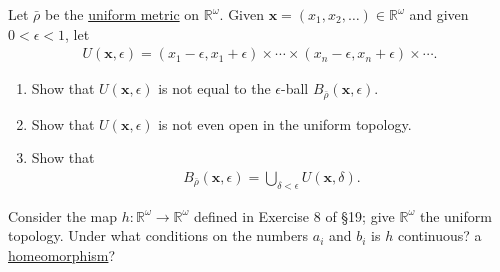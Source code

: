   \begin{exercise}[Munkres 20.6]
    Let $\bar{\rho}$ be the \hyperref[def:uniform-metric]{uniform metric} on $\mathbb{R}^\omega$. Given $\mathbf{x} = (x_1, x_2, \ldots) \in \mathbb{R}^\omega$ and given $0 < \epsilon < 1$, let
    \begin{align*}
      U(\mathbf{x}, \epsilon) = (x_1 - \epsilon, x_1 + \epsilon) \times \cdots \times (x_n - \epsilon, x_n + \epsilon) \times \cdots.
    \end{align*}
    \begin{enumerate} 
      \item[(a)] Show that $U(\mathbf{x}, \epsilon)$ is not equal to the $\epsilon$-ball $B_{\bar{\rho}}(\mathbf{x}, \epsilon)$.
      \item[(b)] Show that $U(\mathbf{x}, \epsilon)$ is not even open in the uniform topology.
      \item[(c)] Show that
      \begin{align*}
        B_{\bar{\rho}}(\mathbf{x}, \epsilon) = \bigcup_{\delta < \epsilon} U(\mathbf{x}, \delta).
      \end{align*}
    \end{enumerate}
  \end{exercise}

  \begin{exercise}[Munkres 20.7]
    Consider the map $h : \mathbb{R}^\omega \to \mathbb{R}^\omega$ defined in Exercise 8 of \S19; give $\mathbb{R}^\omega$ the uniform topology. Under what conditions on the numbers $a_i$ and $b_i$ is $h$ continuous? a \hyperref[def:homeomorphism]{homeomorphism}?
  \end{exercise}

